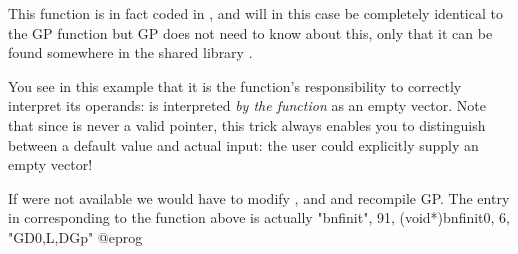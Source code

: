 This function is in fact coded in , and will in this
case be completely identical to the GP function  but GP does
not need to know about this, only that it can be found somewhere in the
shared library .

 You see in this example that it is the
function's responsibility to correctly interpret its operands:  is interpreted {\it by the function\/} as an empty vector. Note that
since  is never a valid  pointer, this trick always
enables you to distinguish between a default value and actual input: the
user could explicitly supply an empty vector!

 If  were not available we would have to
modify , and  and
recompile GP. The entry in  corresponding to the
function above is actually
\bprog
{ "bnfinit", 91, (void*)bnfinit0, 6, "GD0,L,DGp" }
@eprog
\vfill\eject
